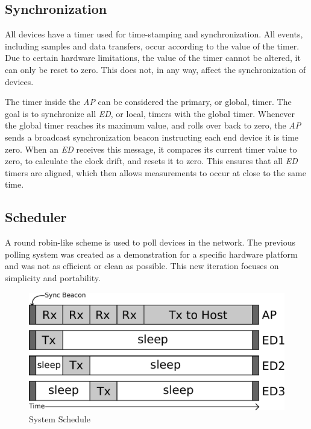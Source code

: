 \documentclass{article}
\begin{document}
\subsection{Synchronization}
All devices have a timer used for time-stamping and synchronization. All events, including samples and data transfers, occur according to the value of the timer. Due to certain hardware limitations, the value of the timer cannot be altered, it can only be reset to zero. This does not, in any way, affect the synchronization of devices.

The timer inside the \emph{AP} can be considered the primary, or global, timer. The goal is to synchronize all \emph{ED}, or local, timers with the global timer. Whenever the global timer reaches its maximum value, and rolls over back to zero, the \emph{AP} sends a broadcast synchronization beacon instructing each end device it is time zero. When an \emph{ED} receives this message, it compares its current timer value to zero, to calculate the clock drift, and resets it to zero. This ensures that all \emph{ED} timers are aligned, which then allows measurements to occur at close to the same time.

\subsection{Scheduler}
A round robin-like scheme is used to poll devices in the network. The previous polling system was created as a demonstration for a specific hardware platform and was not as efficient or clean as possible. This new iteration focuses on simplicity and portability.

\begin{figure}[htb]
\begin{center}
\includegraphics[width=1\textwidth]{figures/sync_schedule.pdf}
\end{center}
\caption{System Schedule}
\label{fig:system_schedule}
\end{figure}
\end{document}

